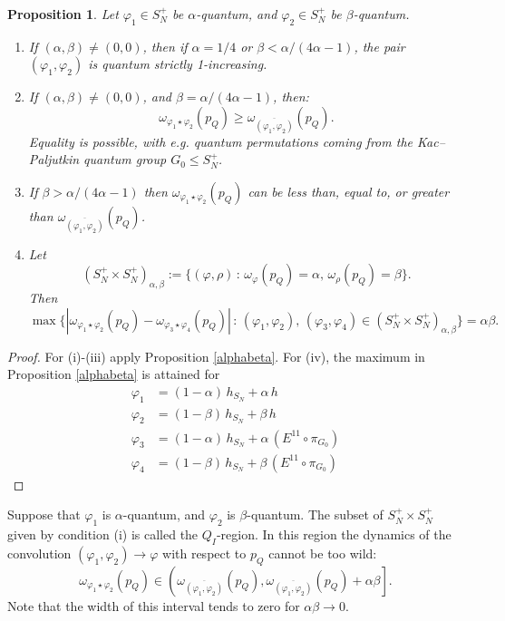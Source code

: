 \documentclass[12pt]{amsart}
\newtheorem{proposition}[theorem]{Proposition}
\theoremstyle{remark}
\theoremstyle{remark}
\begin{document}
\begin{proposition}\label{region}
Let $\varphi_1\in S_N^+$ be $\alpha$-quantum, and $\varphi_2\in S_N^+$ be $\beta$-quantum.
\begin{enumerate}
  \item[(i)] If $(\alpha,\beta)\neq (0,0)$, then if $\alpha=1/4$ or $\beta< \alpha/(4\alpha-1)$,  the pair $(\varphi_1,\varphi_2)$ is \emph{quantum strictly 1-increasing}.
  \item[(ii)] If $(\alpha,\beta)\neq (0,0)$, and $\beta=\alpha/(4\alpha-1)$, then:
  $$\omega_{\varphi_1\star \varphi_2}(p_Q)\geq\omega_{\overline{(\varphi_1,\varphi_2)}}(p_Q).$$
  Equality is possible, with e.g. quantum permutations coming from the Kac--Paljutkin quantum group $G_0\leq S_N^+$.
  \item[(iii)] If  $\beta> \alpha/(4\alpha-1)$ then $\omega_{\varphi_1\star \varphi_2}(p_Q)$ can be less than, equal to, or greater than $\omega_{\overline{(\varphi_1,\varphi_2)}}(p_Q)$.
  \item[(iv)] Let
  $$(S_{N}^+\times S_N^+)_{\alpha,\beta}:=\{(\varphi,\rho)\,\colon\,\omega_\varphi(p_Q)=\alpha,\,\omega_\rho(p_Q)=\beta\}.$$
  Then
$$\max\{|\omega_{\varphi_1\star \varphi_2}(p_Q)-\omega_{\varphi_3\star \varphi_4}(p_Q)|\,\colon\,(\varphi_1,\varphi_2), \,(\varphi_3,\varphi_4)\in (S_{N}^+\times S_N^+)_{\alpha,\beta}\}=\alpha\beta.$$

\end{enumerate}
\end{proposition}
\begin{proof}
For (i)-(iii) apply Proposition \ref{alphabeta}. For (iv), the maximum in Proposition \ref{alphabeta} is attained for
\begin{align*}
 \varphi_1&=(1-\alpha)\,h_{S_N}+\alpha\,h \\
  \varphi_2 & =(1-\beta)\,h_{S_N}+\beta\,h \\
 \varphi_3 & =(1-\alpha)\,h_{S_N}+\alpha\,(E^{11}\circ\pi_{G_0}) \\
  \varphi_4 & =(1-\beta)\,h_{S_N}+\beta\,(E^{11}\circ\pi_{G_0})
\end{align*}
\end{proof}
Suppose that $\varphi_1$ is $\alpha$-quantum, and $\varphi_2$ is $\beta$-quantum. The subset of $S_N^+\times S_N^+$ given by  condition (i) is called the $Q_I$-region. In this region the dynamics of the convolution $(\varphi_1,\varphi_2)\to \varphi$ with respect to $p_Q$ cannot be too wild:
$$\omega_{\varphi_1\star \varphi_2}(p_Q)\in\left(\omega_{\overline{(\varphi_1,\varphi_2)}}(p_Q),\omega_{\overline{(\varphi_1,\varphi_2)}}(p_Q)+\alpha\beta\right].$$
Note that the width of this interval tends to zero for $\alpha\beta\to 0$.
\end{document}

